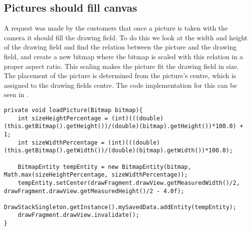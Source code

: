 \subsection{Pictures should fill canvas}
A request was made by the customers that once a picture is taken with the camera it should fill the drawing field.
To do this we look at the width and height of the drawing field and find the relation between the picture and the drawing field, and create a new bitmap where the bitmap is scaled with this relation in a proper aspect ratio.
This scaling makes the picture fit the drawing field in size.
The placement of the picture is determined from the picture's centre, which is assigned to the drawing fields centre.
The code implementation for this can be seen in .

\begin{lstlisting}[caption={Method which scales the picture},label=lst:loadPicture]
private void loadPicture(Bitmap bitmap){
	int sizeHeightPercentage = (int)(((double)(this.getBitmap().getHeight())/(double)(bitmap).getHeight())*100.0) + 1;
	int sizeWidthPercentage = (int)(((double)(this.getBitmap().getWidth())/(double)(bitmap).getWidth())*100.0);
	
	BitmapEntity tempEntity = new BitmapEntity(bitmap, Math.max(sizeHeightPercentage, sizeWidthPercentage));
	tempEntity.setCenter(drawFragment.drawView.getMeasuredWidth()/2, drawFragment.drawView.getMeasuredHeight()/2 - 4.0f);
	DrawStackSingleton.getInstance().mySavedData.addEntity(tempEntity);
	drawFragment.drawView.invalidate();
}
\end{lstlisting}